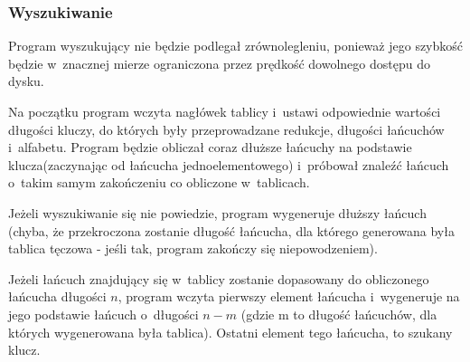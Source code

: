 \documentclass[a4paper]{scrartcl}
\begin{document}
\subsubsection{Wyszukiwanie}
Program wyszukujący nie będzie podlegał zrównolegleniu, ponieważ jego szybkość będzie w~znacznej mierze ograniczona przez prędkość dowolnego dostępu do dysku.

Na początku program wczyta nagłówek tablicy i~ustawi odpowiednie wartości długości kluczy, do których były przeprowadzane redukcje, długości łańcuchów i~alfabetu.
Program będzie obliczał coraz dłuższe łańcuchy na podstawie klucza(zaczynając od łańcucha jednoelementowego) i~próbował znaleźć łańcuch o~takim samym zakończeniu co obliczone w~tablicach.

Jeżeli wyszukiwanie się nie powiedzie, program wygeneruje dłuższy łańcuch (chyba, że przekroczona zostanie długość łańcucha, dla którego generowana była tablica tęczowa - jeśli tak, program zakończy się niepowodzeniem).

Jeżeli łańcuch znajdujący się w~tablicy zostanie dopasowany do obliczonego łańcucha długości $n$, program wczyta pierwszy element łańcucha i~wygeneruje na jego podstawie łańcuch o~długości $n-m$ (gdzie m to długość łańcuchów, dla których wygenerowana była tablica). Ostatni element tego łańcucha, to szukany klucz.
\end{document}
